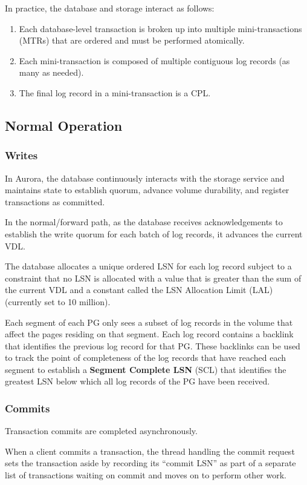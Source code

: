 \documentclass[11pt]{article}
\begin{document}
In practice, the database and storage interact as follows:
\begin{enumerate}
\item Each database-level transaction is broken up into multiple mini-transactions (MTRs) that are
ordered and must be performed atomically.
\item Each mini-transaction is composed of multiple contiguous log records (as many as needed).
\item The final log record in a mini-transaction is a CPL.
\end{enumerate}
\subsection{Normal Operation}
\label{sec:org46e2dce}
\subsubsection{Writes}
\label{sec:org06d579d}
In Aurora, the database continuously interacts with the storage service and maintains state to
establish quorum, advance volume durability, and register transactions as committed.

In the normal/forward path, as the database receives acknowledgements to establish the write quorum
for each batch of log records, it advances the current VDL.

The database allocates a unique ordered LSN for each log record subject to a constraint that no LSN is
allocated with a value that is greater than the sum of the current VDL and a constant called the LSN
Allocation Limit (LAL) (currently set to 10 million).

Each segment of each PG only sees a subset of log records in the volume that affect the pages residing
on that segment. Each log record contains a backlink that identifies the previous log record for that
PG. These backlinks can be used to track the point of completeness of the log records that have
reached each segment to establish a \textbf{Segment Complete LSN} (SCL) that identifies the greatest LSN below
which all log records of the PG have been received.
\subsubsection{Commits}
\label{sec:orgdff0f6a}
Transaction commits are completed asynchronously.

When a client commits a transaction, the thread handling the commit request sets the transaction aside
by recording its “commit LSN” as part of a separate list of transactions waiting on commit and moves
on to perform other work.
\end{document}
